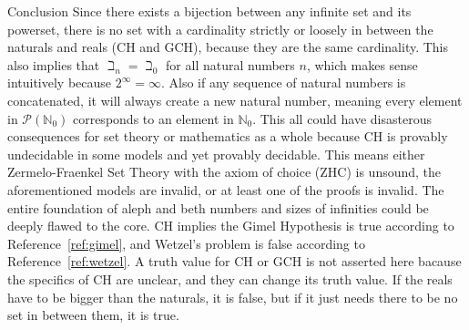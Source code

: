 \documentclass[12pt]{article}
\begin{document}
\begin{section}{Conclusion}\label{sec:conclusion}
	Since there exists a bijection between any infinite set and its powerset, there is no set
	with a cardinality strictly or loosely in between the naturals and reals (CH and GCH), because
	they are the same cardinality. This also implies that $\beth_n=\beth_0$ for all natural numbers
	$n$, which makes sense intuitively because $2^\infty=\infty$. Also if any sequence of natural
	numbers is concatenated, it will always create a new natural number, meaning every element in
	$\mathcal P(\mathbb N_0)$ corresponds to an element in $\mathbb N_0$. This all could have
	disasterous consequences for set theory or mathematics as a whole because CH is provably
	undecidable in some models and yet provably decidable. This means either Zermelo-Fraenkel Set
	Theory with the axiom of choice (ZHC) is unsound, the aforementioned models are invalid, or at
	least one of the proofs is invalid. The entire foundation of aleph and beth numbers and sizes of
	infinities could be deeply flawed to the core. CH implies the Gimel Hypothesis is true according
	to Reference~\ref{ref:gimel}, and Wetzel's problem is false according to Reference~\ref{ref:wetzel}.
	A truth value for CH or GCH is not asserted here bacause the specifics of CH are unclear, and they can
	change its truth value. If the reals have to be bigger than the naturals, it is false, but if it
	just needs there to be no set in between them, it is true.
\end{section}
\end{document}
